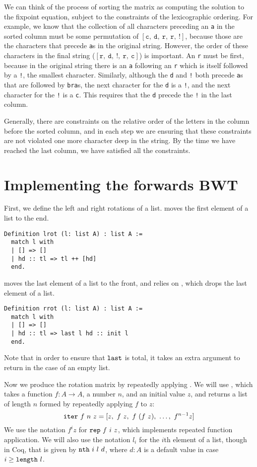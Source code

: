 \documentclass[sigplan,10pt,anonymous,review]{thesis}
\begin{document}
We can think of the process of sorting the matrix as computing the
solution to the fixpoint equation, subject to the constraints of the
lexicographic ordering. For example, we know that the collection of
all characters preceding an \texttt{a} in the sorted column must be
some permutation of
$[\texttt{c},~\texttt{d},~\texttt{r},~\texttt{r},~\texttt{!}]$,
because those are the characters that precede \texttt{a}s in the
original string. However, the order of these characters in the final
string
($[\texttt{r},~\texttt{d},~\texttt{!},~\texttt{r},~\texttt{c}]$) is
important. An \texttt{r} must be first, because in the original string
there is an \texttt{a} following an \texttt{r} which is itself
followed by a \texttt{!}, the smallest character. Similarly, although
the \texttt{d} and \texttt{!} both precede \texttt{a}s that are
followed by \texttt{bra}s, the next character for the \texttt{d} is a
\texttt{!}, and the next character for the \texttt{!} is a \texttt{c}.
This requires that the \texttt{d} precede the \texttt{!} in the last
column.

Generally, there are constraints on the relative order of the letters
in the column before the sorted column, and in each step we are
ensuring that these constraints are not violated one more character
deep in the string. By the time we have reached the last column, we
have satisfied all the constraints.

\section{Implementing the forwards BWT}
\label{sec:forwards_BWT}

First, we define the left and right rotations of a list. 
moves the first element of a list to the end.
\begin{lstlisting}
Definition lrot (l: list A) : list A :=
  match l with
  | [] => []
  | hd :: tl => tl ++ [hd]
  end.
\end{lstlisting}
 moves the last element of a list to the front, and
relies on , which drops the last element of a list.
\begin{lstlisting}
Definition rrot (l: list A) : list A :=
  match l with
  | [] => []
  | hd :: tl => last l hd :: init l
  end.
\end{lstlisting}
Note that in order to ensure that $\texttt{\textup{last}}$ is total, it takes
an extra argument to return in the case of an empty list.

Now we produce the rotation matrix by repeatedly applying .
We will use , which takes a function $f : A \to A$, a number
$n$, and an initial value $z$, and returns a list of length $n$ formed
by repeatedly applying $f$ to $z$:
\begin{equation*}
  \texttt{\textup{iter}}~f~n~z = [z,~f~z,~f~(f~z),~\ldots,~f^{n-1} z]
  \label{eq:iter}
\end{equation*}
We use the notation $f^i z$ for $\texttt{\textup{rep}}~f~i~z$, which implements
repeated function application. We will also use the notation $l_i$ for
the $i$th element of a list, though in Coq, that is given by
$\texttt{\textup{nth}}~i~l~d$, where $d:A$ is a default value in case $i \ge
\texttt{\textup{length}}~l$.
\end{document}
